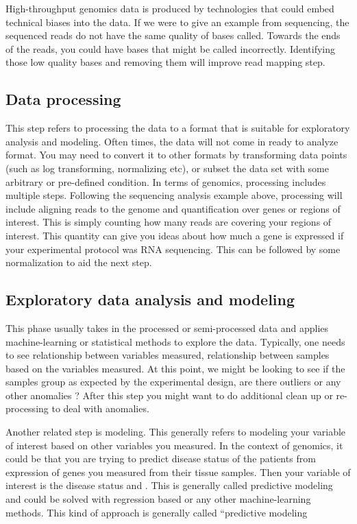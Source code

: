 High-throughput genomics data is produced by technologies that could embed technical biases into the data. If we were to give an example from sequencing, the sequenced reads do not have the same quality of bases called. Towards the ends of the reads, you could have bases that might be called incorrectly. Identifying those low quality bases and removing them will improve read mapping step.

\subsection{Data processing}
This step refers to processing the data to a format that is suitable for exploratory analysis and modeling. Often times, the data will not come in ready to analyze format. You may need to convert it to other formats by transforming data points (such as log transforming, normalizing etc), or subset the data set with some arbitrary or pre-defined condition. In terms of genomics, processing includes multiple steps. Following the sequencing analysis example above, processing will include aligning reads to the genome and quantification over genes or regions of interest. This is simply counting how many reads are covering your regions of interest. This quantity can give you ideas about how much a gene is expressed if your experimental protocol was RNA sequencing. This can be followed by some normalization to aid the next step.

\subsection{Exploratory data analysis and modeling}  
This phase usually takes in the processed or semi-processed data and applies machine-learning or statistical methods to explore the data. Typically, one needs to see relationship between variables measured, relationship between samples based on the variables measured. At this point, we might be looking to see if the samples group as expected by the experimental design, are there outliers or any other anomalies ? After this step you might want to do additional clean up or re-processing to deal with anomalies.

Another related step is modeling. This generally refers to modeling your variable of interest based on other variables you measured. In the context of genomics, it could be that you are trying to predict disease status of the patients from expression of genes you measured from their tissue samples. Then your variable of interest is the disease status and . This is generally called predictive modeling and could be solved with regression based or any other machine-learning methods. This kind of approach is generally called “predictive modeling

